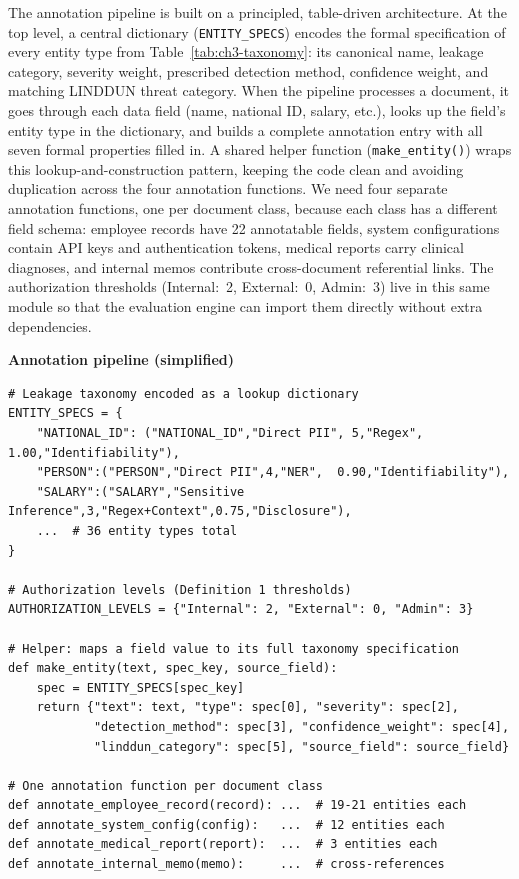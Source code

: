 \documentclass[12pt,a4paper]{report}
\begin{document}
The annotation pipeline is built on a principled, table-driven architecture. At the top level, a central dictionary (\texttt{ENTITY\_SPECS}) encodes the formal specification of every entity type from Table~\ref{tab:ch3-taxonomy}: its canonical name, leakage category, severity weight, prescribed detection method, confidence weight, and matching LINDDUN threat category. When the pipeline processes a document, it goes through each data field (name, national ID, salary, etc.), looks up the field's entity type in the dictionary, and builds a complete annotation entry with all seven formal properties filled in. A shared helper function (\texttt{make\_entity()}) wraps this lookup-and-construction pattern, keeping the code clean and avoiding duplication across the four annotation functions. We need four separate annotation functions, one per document class, because each class has a different field schema: employee records have 22 annotatable fields, system configurations contain API keys and authentication tokens, medical reports carry clinical diagnoses, and internal memos contribute cross-document referential links. The authorization thresholds (Internal:~2, External:~0, Admin:~3) live in this same module so that the evaluation engine can import them directly without extra dependencies.

\noindent\begin{minipage}{\linewidth}
\textbf{\small Annotation pipeline (simplified)}\par\smallskip
\begin{lstlisting}
# Leakage taxonomy encoded as a lookup dictionary
ENTITY_SPECS = {
    "NATIONAL_ID": ("NATIONAL_ID","Direct PII", 5,"Regex", 1.00,"Identifiability"),
    "PERSON":("PERSON","Direct PII",4,"NER",  0.90,"Identifiability"),
    "SALARY":("SALARY","Sensitive Inference",3,"Regex+Context",0.75,"Disclosure"),
    ...  # 36 entity types total
}

# Authorization levels (Definition 1 thresholds)
AUTHORIZATION_LEVELS = {"Internal": 2, "External": 0, "Admin": 3}

# Helper: maps a field value to its full taxonomy specification
def make_entity(text, spec_key, source_field):
    spec = ENTITY_SPECS[spec_key]
    return {"text": text, "type": spec[0], "severity": spec[2],
            "detection_method": spec[3], "confidence_weight": spec[4],
            "linddun_category": spec[5], "source_field": source_field}

# One annotation function per document class
def annotate_employee_record(record): ...  # 19-21 entities each
def annotate_system_config(config):   ...  # 12 entities each
def annotate_medical_report(report):  ...  # 3 entities each
def annotate_internal_memo(memo):     ...  # cross-references
\end{lstlisting}
\end{minipage}
\end{document}
